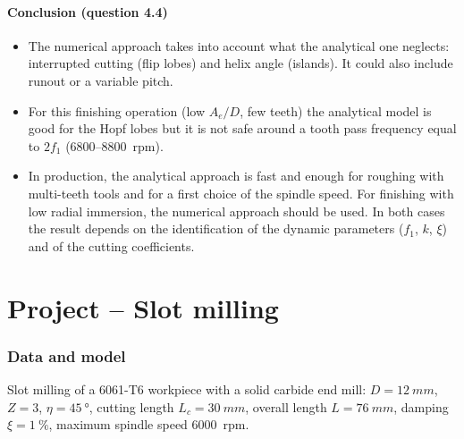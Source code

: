 \documentclass[11pt,a4paper]{article}
\begin{document}
\subsection{Conclusion (question 4.4)}
\begin{itemize}
  \item The numerical approach takes into account what the analytical one neglects:
        interrupted cutting (flip lobes) and helix angle (islands). It could also include
        runout or a variable pitch.
  \item For this finishing operation (low $A_e/D$, few teeth) the analytical model is good
        for the Hopf lobes but it is not safe around a tooth pass frequency equal to
        $2f_1$ (\numrange{6800}{8800}~rpm).
  \item In production, the analytical approach is fast and enough for roughing with
        multi-teeth tools and for a first choice of the spindle speed. For finishing with low
        radial immersion, the numerical approach should be used. In both cases the result depends on the identification of the
        dynamic parameters ($f_1$, $k$, $\xi$) and of the cutting coefficients.
\end{itemize}

\part*{Project -- Slot milling}
\section{Data and model}
Slot milling of a 6061-T6 workpiece with a solid carbide end mill: $D=\SI{12}{mm}$, $Z=3$,
$\eta=\SI{45}{\degree}$, cutting length $L_c=\SI{30}{mm}$, overall length $L=\SI{76}{mm}$,
damping $\xi=\SI{1}{\percent}$, maximum spindle speed \SI{6000}{rpm}.
\end{document}
